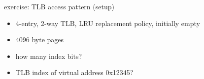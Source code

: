 \begin{frame}{exercise: TLB access pattern (setup)}
\begin{itemize}
\item 4-entry, 2-way TLB, LRU replacement policy, initially empty
\item 4096 byte pages
\item how many index bits?
\item TLB index of virtual address 0x12345?
\end{itemize}
\end{frame}
